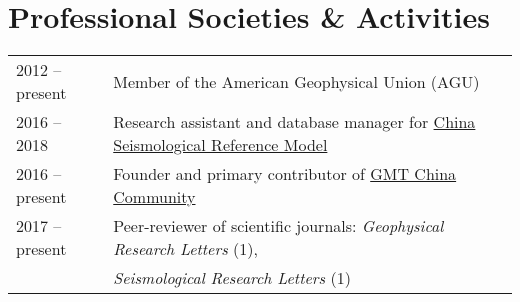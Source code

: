 \section*{Professional Societies \& Activities}

\begin{tabular}{ll}
2012 -- present & Member of the American Geophysical Union (AGU) \\
2016 -- 2018    & Research assistant and database manager for \href{http://chinageorefmodel.org/}{China Seismological Reference Model} \\
2016 -- present & Founder and primary contributor of \href{http://gmt-china.org/}{GMT China Community} \\
2017 -- present & Peer-reviewer of scientific journals: \textit{Geophysical Research Letters} (1), \\
				& 										\textit{Seismological Research Letters} (1) \\
\end{tabular}
